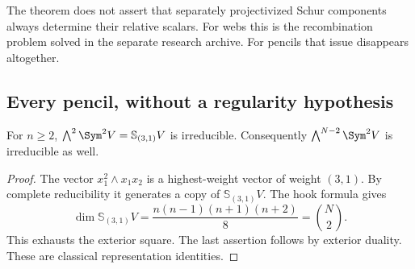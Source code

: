 The theorem does not assert that separately projectivized Schur
components always determine their relative scalars.  For webs this
is the recombination problem solved in the separate research archive.  For pencils that issue
disappears altogether.

\subsection{Every pencil, without a regularity hypothesis}

\begin{lemma}
\label{lem:pencil-irreducibility}
For \(n\ge2\), \(\bigwedge^2\Sym^2V=\mathbb S_{(3,1)}V\)
is irreducible.  Consequently
\(\bigwedge^{N-2}\Sym^2V\) is irreducible as well.
\end{lemma}
\begin{proof}
The vector \(x_1^2\wedge x_1x_2\) is a highest-weight vector of
weight \((3,1)\).  By complete reducibility it generates a copy of
\(\mathbb S_{(3,1)}V\).  The hook formula gives
\[
 \dim\mathbb S_{(3,1)}V
   =\frac{n(n-1)(n+1)(n+2)}8
   =\binom{N}{2}.
\]
This exhausts the exterior square.  The last assertion follows by
exterior duality.  These are classical representation identities.
\end{proof}

